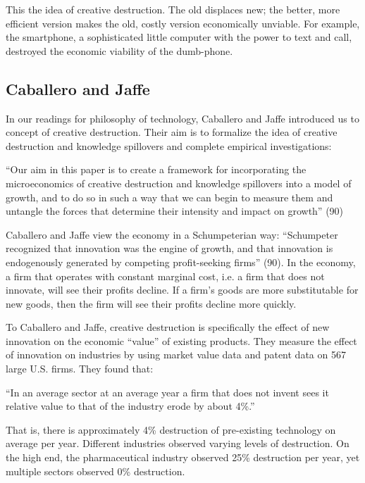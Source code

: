\documentclass[11pt]{article}
\begin{document}
This the idea of creative destruction.
The old displaces new; the better, more efficient version makes the old, costly version economically unviable.
For example, the smartphone, a sophisticated little computer with the power to text and call, destroyed the economic viability of the dumb-phone.

\subsection{Caballero and Jaffe}
In our readings for philosophy of technology, Caballero and Jaffe introduced us to concept of creative destruction.
Their aim is to formalize the idea of creative destruction and knowledge spillovers and complete empirical investigations:
\begin{displayquote}
    ``Our aim in this paper is to create a framework for incorporating the microeconomics of creative destruction and knowledge spillovers into a model of growth, and to do so in such a way that we can begin to measure them and untangle the forces that determine their intensity and impact on growth'' \cite{jaffe} (90)
\end{displayquote}

Caballero and Jaffe view the economy in a Schumpeterian way: ``Schumpeter recognized that innovation was the engine of growth, and that innovation is endogenously generated by competing profit-seeking firms'' (90). 
In the economy, a firm that operates with constant marginal cost, i.e. a firm that does not innovate, will see their profits decline. 
If a firm's goods are more substitutable for new goods, then the firm will see their profits decline more quickly.

To Caballero and Jaffe, creative destruction is specifically the effect of new innovation on the economic ``value'' of existing products.
They measure the effect of innovation on industries by using market value data and patent data on 567 large U.S. firms.
They found that:
\begin{displayquote}
    ``In an average sector at an average year a firm that does not invent sees it relative value to that of the industry erode by about 4\%.'' \cite{jaffe}
\end{displayquote}
That is, there is approximately 4\% destruction of pre-existing technology on average per year. 
Different industries observed varying levels of destruction.
On the high end, the pharmaceutical industry observed 25\% destruction per year, yet multiple sectors observed 0\% destruction.
\end{document}
